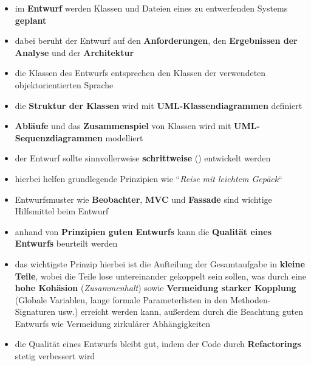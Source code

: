 \begin{itemize}
    \item im \textbf{Entwurf} werden Klassen und Dateien eines zu entwerfenden Systems \textbf{geplant}
    \item dabei beruht der Entwurf auf den \textbf{Anforderungen}, den \textbf{Ergebnissen der Analyse} und der \textbf{Architektur}
    \item die Klassen des Entwurfs entsprechen den Klassen der verwendeten objektorientierten Sprache
    \item die \textbf{Struktur der Klassen} wird mit \textbf{UML-Klassendiagrammen} definiert
    \item \textbf{Abläufe} und das \textbf{Zusammenspiel} von Klassen wird mit \textbf{UML-Sequenzdiagrammen} modelliert
    \item der Entwurf sollte sinnvollerweise \textbf{schrittweise} () entwickelt werden
    \item hierbei helfen grundlegende Prinzipien wie ``\textit{Reise mit leichtem Gepäck}``
    \item Entwurfsmuster wie \textbf{Beobachter}, \textbf{MVC} und \textbf{Fassade} sind wichtige Hilfsmittel beim Entwurf
    \item anhand von \textbf{Prinzipien guten Entwurfs} kann die \textbf{Qualität eines Entwurfs} beurteilt werden
    \item das wichtigste Prinzip hierbei ist die Aufteilung der Gesamtaufgabe in \textbf{kleine Teile}, wobei die Teile lose untereinander gekoppelt sein sollen, was durch eine \textbf{hohe Kohäsion} (\textit{Zusammenhalt}) sowie \textbf{Vermeidung starker Kopplung} (Globale Variablen, lange formale Parameterlisten in den Methoden-Signaturen usw.) erreicht werden kann, außerdem durch die Beachtung guten Entwurfs wie Vermeidung zirkulärer Abhängigkeiten
    \item die Qualität eines Entwurfs bleibt gut, indem der Code durch \textbf{Refactorings} stetig verbessert wird
\end{itemize}
